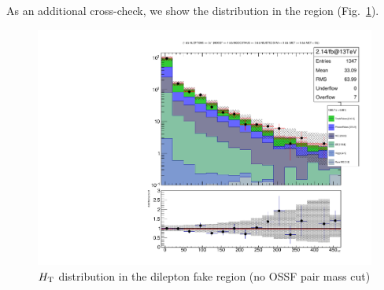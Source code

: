 As an additional cross-check, we show the \HT distribution in the \Z region (Fig.~\ref{fig:fakeLight_Z_HT}).

\begin{figure}
\begin{center}
	\includegraphics[width=.7\textwidth]{Background/bkg_fakeLight/Z_HT}
	\caption{$H_{\mathrm{T}}$ distribution in the dilepton fake region (no OSSF pair mass cut)
	\label{fig:fakeLight_Z_HT}}
\end{center}
\end{figure}
